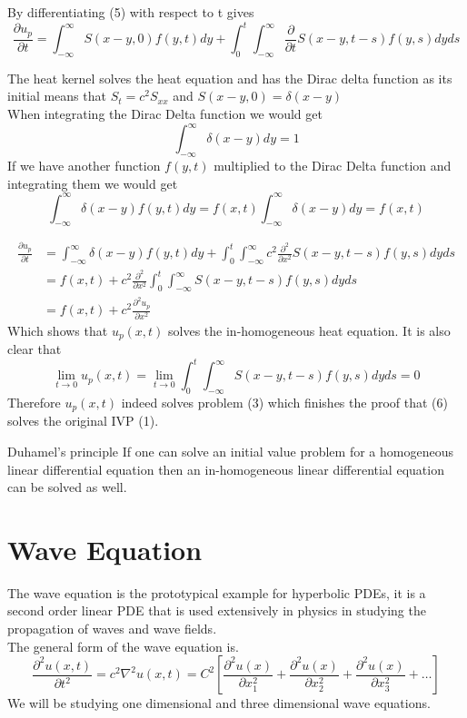 By differentiating (5) with respect to t gives
\[
    \frac{\partial u_p}{\partial t} = \int_{-\infty}^{\infty}S(x-y,0) f(y,t) dy  + \int_{0}^{t}\int_{-\infty}^{\infty}\frac{\partial}{\partial t}S(x-y,t-s) f(y,s)dyds    
\]
\begin{enrichment*}{}
    The heat kernel solves the heat equation and has the Dirac delta function as its initial
    means that $S_t =c^2 S_{xx}$ and $S(x-y,0) = \delta(x-y)$
    \\
    When integrating the Dirac Delta function we would get
    \[
        \int_{-\infty}^{\infty}\delta(x-y) dy = 1
    \]
    If we have another function $f(y,t)$ multiplied to the Dirac Delta function and integrating them we would get
    \[
        \int_{-\infty}^{\infty}\delta(x-y) f(y,t) dy = f(x,t)\int_{-\infty}^{\infty}\delta(x-y) dy = f(x,t) 
    \]
\end{enrichment*}
\begin{align*}
    \frac{\partial u_p}{\partial t} &= \int_{-\infty}^{\infty}\delta(x-y) f(y,t) dy  + \int_{0}^{t}\int_{-\infty}^{\infty}c^2 \frac{\partial^2}{\partial x^2}S(x-y,t-s) f(y,s)dyds
    \\
    &= f(x,t) + c^2 \frac{\partial^2}{\partial x^2} \int_{0}^{t}\int_{-\infty}^{\infty}S(x-y,t-s) f(y,s)dyds
    \\
    &= f(x,t) + c^2 \frac{\partial^2 u_p}{\partial x^2}
\end{align*}
Which shows that $u_p(x,t)$ solves the in-homogeneous heat equation. It is also clear that
\[
\lim_{t \to 0} u_p(x,t)  = \lim_{t \to 0}\int_{0}^{t} \int_{-\infty}^{\infty}S(x-y,t-s) f(y,s)dyds = 0
\]
Therefore $u_p(x,t)$ indeed solves problem (3) which finishes the proof that (6) solves the original IVP (1).
\begin{enrichment*}{Duhamel's principle}
    If one can solve an initial value problem for a homogeneous linear differential equation then an in-homogeneous linear differential equation can be solved as well.
\end{enrichment*}    


\newpage
\setcounter{equation}{0}
\section{Wave Equation}
The wave equation is the prototypical example for hyperbolic PDEs, it is a second order linear PDE that is used extensively in physics in studying the propagation of waves and wave fields. 
\\
The general form of the wave equation is.
\[
\frac{\partial^2 u(x,t)}{\partial t^2} = c^2\nabla^2 u(x,t) = C^2\left[\frac{\partial^2 u(x)}{\partial x^{2}_{1}} + \frac{\partial^2 u(x)}{\partial x^{2}_{2}} + \frac{\partial^2 u(x)}{\partial x^{2}_{3}} + \dots\right]    
\]
We will be studying one dimensional and three dimensional wave equations.
\setcounter{equation}{0}
